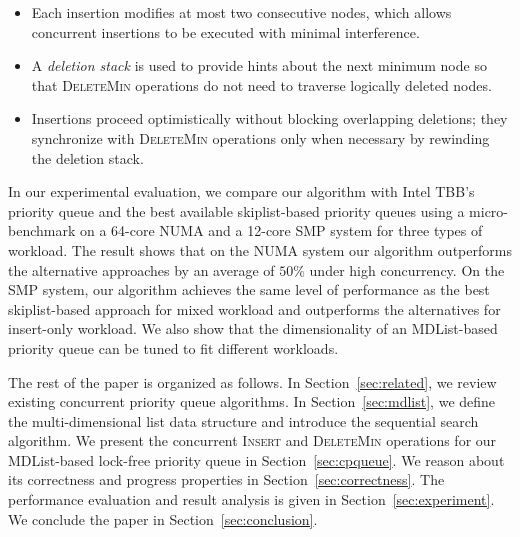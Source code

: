 \documentclass[10pt,journal,letter,compsoc]{IEEEtran}
\begin{document}
\begin{itemize}
    \item Each insertion modifies at most two consecutive nodes, which allows concurrent insertions to be executed with minimal interference.
    \item A \emph{deletion stack} is used to provide hints about the next minimum node so that \textsc{DeleteMin} operations do not need to traverse logically deleted nodes.
    \item Insertions proceed optimistically without blocking overlapping deletions; they synchronize with \textsc{DeleteMin} operations only when necessary by rewinding the deletion stack.
\end{itemize}

In our experimental evaluation, we compare our algorithm with Intel TBB's priority queue and the best available skiplist-based priority queues using a micro-benchmark on a 64-core NUMA and a 12-core SMP system for three types of workload. 
The result shows that on the NUMA system our algorithm outperforms the alternative approaches by an average of $50\%$ under high concurrency.
On the SMP system, our algorithm achieves the same level of performance as the best skiplist-based approach for mixed workload and outperforms the alternatives for insert-only workload. 
We also show that the dimensionality of an MDList-based priority queue can be tuned to fit different workloads.

The rest of the paper is organized as follows. 
In Section~\ref{sec:related}, we review existing concurrent priority queue algorithms.
In Section~\ref{sec:mdlist}, we define the multi-dimensional list data structure and introduce the sequential search algorithm.
We present the concurrent \textsc{Insert} and \textsc{DeleteMin} operations for our MDList-based lock-free priority queue in Section~\ref{sec:cpqueue}.
We reason about its correctness and progress properties in Section~\ref{sec:correctness}.
The performance evaluation and result analysis is given in Section~\ref{sec:experiment}.
We conclude the paper in Section~\ref{sec:conclusion}.

\end{document}
